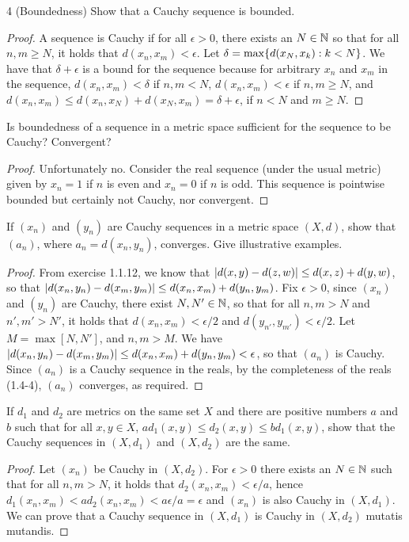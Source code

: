 \begin{exercise}{4 (Boundedness)}
Show that a Cauchy sequence is bounded.
\end{exercise}
\begin{proof}
A sequence is Cauchy if for all $\epsilon>0$, there exists an $N\in\mathbb{N}$ so that for all $n,m\geq N$, it holds that $d(x_n,x_m)<\epsilon$. Let $\delta=\max\{d(x_N,x_k):k<N\}$. We have that $\delta+\epsilon$ is a bound for the sequence because for arbitrary $x_n$ and $x_m$ in the sequence, $d(x_n,x_m)<\delta$ if $n,m<N$, $d(x_n,x_m)<\epsilon$ if $n,m\geq N$, and $d(x_n,x_m)\leq d(x_n,x_N)+d(x_N,x_m)=\delta+\epsilon$, if $n<N$ and $m\geq N$. 
\end{proof}

\begin{exercise}{5}
Is boundedness of a sequence in a metric space sufficient for the sequence to be Cauchy? Convergent?
\end{exercise}
\begin{proof}
Unfortunately no. Consider the real sequence (under the usual metric) given by $x_n=1$ if $n$ is even and $x_n=0$ if $n$ is odd. This sequence is pointwise bounded but certainly not Cauchy, nor convergent.
\end{proof}

\begin{exercise}{6}
If $(x_n)$ and $(y_n)$ are Cauchy sequences in a metric space $(X,d)$, show that $(a_n)$, where $a_n=d(x_n,y_n)$, converges. Give illustrative examples.
\end{exercise}
\begin{proof}
From exercise 1.1.12, we know that $\left\lvert d(x,y)-d(z,w)\right\rvert\leq d(x,z)+d(y,w)$, so that $\left\lvert d(x_n,y_n)-d(x_m,y_m)\right\rvert\leq d(x_n,x_m)+d(y_n,y_m)$. Fix $\epsilon>0$, since $(x_n)$ and $(y_n)$ are Cauchy, there exist $N,N'\in\mathbb{N}$, so that for all $n,m>N$ and $n',m'>N'$, it holds that $d(x_n,x_m)<\epsilon/2$ and $d(y_{n'},y_{m'})<\epsilon/2$. Let $M=\max[N,N']$, and $n,m>M$. We have $\left\lvert d(x_n,y_n)-d(x_m,y_m)\right\rvert\leq d(x_n,x_m)+d(y_n,y_m)<\epsilon$, so that $(a_n)$ is Cauchy. Since $(a_n)$ is a Cauchy sequence in the reals, by the completeness of the reals (1.4-4), $(a_n)$ converges, as required.
\end{proof}

\begin{exercise}{8}
If $d_1$ and $d_2$ are metrics on the same set $X$ and there are positive numbers $a$ and $b$ such that for all $x,y\in X$, $ad_1(x,y)\leq d_2(x,y)\leq bd_1(x,y)$, show that the Cauchy sequences in $(X,d_1)$ and $(X,d_2)$ are the same.
\end{exercise}
\begin{proof}
Let $(x_n)$ be Cauchy in $(X,d_2)$. For $\epsilon>0$ there exists an $N\in\mathbb{N}$ such that for all $n,m>N$, it holds that $d_2(x_n,x_m)<\epsilon/a$, hence $d_1(x_n,x_m)<ad_2(x_n,x_m)<a\epsilon/a=\epsilon$ and $(x_n)$ is also Cauchy in $(X,d_1)$. We can prove that a Cauchy sequence in $(X,d_1)$ is Cauchy in $(X,d_2)$ mutatis mutandis.
\end{proof}

